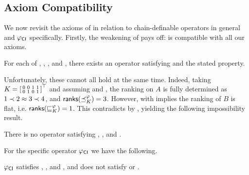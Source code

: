 \subsection{Axiom Compatibility}

We now revisit the axioms of  in relation to
chain-definable operators in general and ${\varphi_{\mathsf{CI}}}$ specifically. Firstly,
the weakening of  pays off:  is
compatible with all our axioms.

\begin{theorem}
    \label{tourn_result_chaindef_axiom_compatibilities}

    For each of , , ,
     and , there exists an operator satisfying
     and the stated property.

\end{theorem}

Unfortunately, these cannot all hold at the same time. Indeed, taking
$
    K = \left[\begin{smallmatrix}
        0 & 0 & 1 & 1 \\
        0 & 1 & 0 & 1
    \end{smallmatrix}\right]^\top
$
and assuming  and , the ranking on $A$ is
fully determined as $1 \prec 2 \approx 3 \prec 4$, and $\mathsf{ranks}({\preceq_K^\varphi}) = 3$.
However,  with  implies the ranking of $B$ is
flat, i.e.  $\mathsf{ranks}({\sqsubseteq_K^\varphi}) = 1$. This contradicts  by
, yielding the following
impossibility result.

\begin{theorem}
    \label{tourn_result_chaindef_impossibility}

    There is no operator satisfying , ,
     and .

\end{theorem}

For the specific operator ${\varphi_{\mathsf{CI}}}$ we have the following.

\begin{theorem}
    \label{tourn_result_phicardint_axioms}

    ${\varphi_{\mathsf{CI}}}$ satisfies , ,
     and , and does not satisfy  or
    .

\end{theorem}

